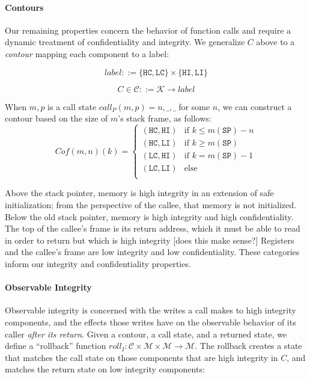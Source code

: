 \documentclass[conference]{IEEEtran}
\begin{document}
    \paragraph{Contours}

      Our remaining properties concern the behavior of function calls and require a dynamic treatment
      of confidentiality and integrity. We generalize \(C\) above to a {\it contour} mapping each component
      to a label:

      \[\mathit{label} ::= \{\mathtt{HC},\mathtt{LC}\} \times \{\mathtt{HI},\mathtt{LI}\}\]

      \[C \in \mathcal{C} ::= \mathcal{K} \rightarrow \mathit{label}\]

      When \(m,p\) is a call state \(\mathit{call}_P(m,p) = n,\_,\_\) for some \(n\),
      we can construct a contour based on the size of \(m\)'s stack frame, as follows:
      \[\mathit{Cof}(m,n)(k) =
      \begin{cases}
        (\mathtt{HC},\mathtt{HI}) & \text{if } k \leq m(\mathtt{SP}) - n \\
        (\mathtt{HC},\mathtt{LI}) & \text{if } k \geq m(\mathtt{SP}) \\
        (\mathtt{LC},\mathtt{HI}) & \text{if } k = m(\mathtt{SP}) - 1 \\
        (\mathtt{LC},\mathtt{LI}) & \text{else} \\
      \end{cases}\]

      Above the stack pointer, memory is high integrity in an extension of safe initialization;
      from the perspective of the callee, that memory is not initialized. Below the old stack
      pointer, memory is high integrity and high confidentiality. The top of the callee's frame
      is its return address, which it must be able to read in order to return but which is
      high integrity [does this make sense?] Registers and the callee's frame are low integrity
      and low confidentiality. These categories inform our integrity and confidentiality properties.

    \paragraph{Observable Integrity}

      Observable integrity is concerned with the writes a call makes to high integrity components,
      and the effects those writes have on the observable behavior of its caller
      {\it after its return}. Given a contour, a call state, and a returned state, we define
      a ``rollback'' function \(\mathit{roll}_I : \mathcal{C} \times \mathcal{M} \times \mathcal{M}
      \rightarrow \mathcal{M}\). The rollback creates a state that matches the call
      state on those components that are high integrity in \(C\), and matches the return state
      on low integrity components:
\end{document}
